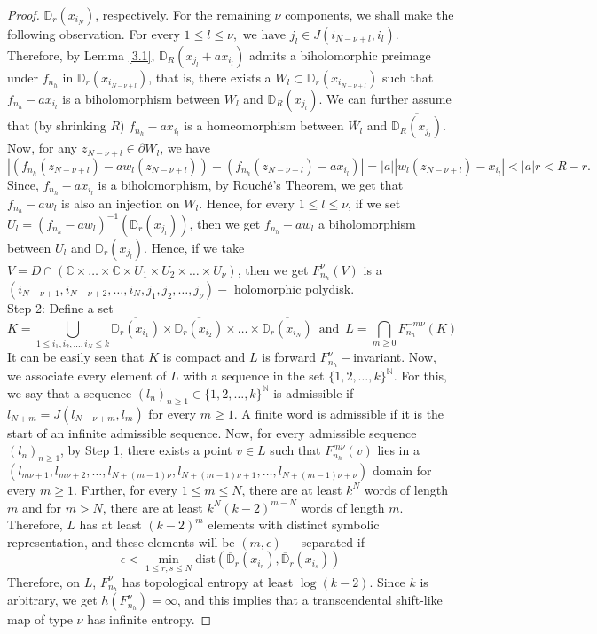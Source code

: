 \documentclass[12pt, reqno]{amsart}
\numberwithin{equation}{section}
\theoremstyle{definition}
\theoremstyle{remark}
\theoremstyle{plain}
\theoremstyle{definition}
\numberwithin{equation}{section}
\begin{document}
\begin{proof}
$\mathbb{D}_r(x_{i_{N}})$, respectively. For the remaining $\nu$ components, we shall make the following observation.
For every $1\leq l\leq \nu,$ we have $j_{l}\in J(i_{N-\nu+l}, i_l)$. Therefore, by Lemma \ref{3.1}, $\mathbb{D}_R(x_{j_{l}}+ax_{i_{l}})$ admits a biholomorphic preimage under $f_{n_h}$ in $\mathbb{D}_r(x_{i_{N-\nu+l}})$, that is, there exists a $W_l\subset \mathbb{D}_r(x_{i_{N-\nu+l}})$ such that $f_{n_h}-ax_{i_l}$ is a biholomorphism between $W_l$ and $\mathbb{D}_R(x_{j_l})$. We can further assume that (by shrinking $R$) $f_{n_h}-ax_{i_l}$ is a homeomorphism between $\overline{W_l}$ and  $\overline{\mathbb{D}_R(x_{j_l})}$. Now, for any $z_{N-\nu+l}\in\partial W_l$, we have 
\[|(f_{n_h}(z_{N-\nu+l})-aw_l(z_{N-\nu+l}))-(f_{n_h}(z_{N-\nu+l})-ax_{i_l})|=|a||w_l(z_{N-\nu+l})-x_{i_l}|<|a|r<R-r.\]
Since, $f_{n_h}-ax_{i_l}$ is a biholomorphism, by Rouch\'e's Theorem, we get that $f_{n_h}-aw_l$ is also an injection on $W_l$. Hence, for every $1\leq l\leq \nu$, if we set $U_l=(f_{n_h}-aw_l)^{-1}(\mathbb{D}_r(x_{j_l}))$, then we get $f_{n_h}-aw_l$ a biholomorphism between $U_l$ and $\mathbb{D}_r(x_{j_l})$. Hence, if we take $V=D\cap (\mathbb{C}\times\dots\times \mathbb{C}\times U_1\times U_2\times\dots\times U_{\nu})$, then we get $F^{\nu}_{n_h}(V)$ is a $(i_{N-\nu+1}, i_{N-\nu+2},\dots,i_N, j_1, j_2,\dots, j_{\nu})-$ holomorphic polydisk.\\
Step 2:  Define a set 
\[K=\bigcup_{1\leq i_1,i_2,\dots,i_N\leq k}\overline{\mathbb{D}_r(x_{i_1})}\times\overline{\mathbb{D}_r(x_{i_2})}\times\dots\times\overline{\mathbb{D}_r(x_{i_N})} \,\text{ and }\,L=\bigcap_{m\geq 0}F_{n_h}^{-m\nu}(K)\]
It can be easily seen that $K$ is compact and $L$ is forward $F_{n_h}^{\nu}-$invariant. Now, we associate every element of $L$ with a sequence in the set $\{1,2,\dots,k\}^{\mathbb{N}}$. For this, we say that a sequence $(l_n)_{n\geq 1}\in\{1,2,\dots,k\}^{\mathbb{N}}$ is admissible if $l_{N+m}=J(l_{N-\nu+m}, l_m)$ for every $m\geq 1$. A finite word is admissible if it is the start of an infinite admissible sequence. Now, for every admissible sequence $(l_n)_{n\geq 1}$, by Step 1, there exists a point $v\in L$ such that $F_{n_h}^{m\nu}(v)$ lies in a $(l_{m\nu+1}, l_{m\nu+2},\dots,l_{N+(m-1)\nu}, l_{N+{(m-1)\nu}+1},\dots, l_{N+{(m-1)\nu+\nu}})$ domain for every $m\geq 1$. Further, for every $ 1\leq m\leq N$, there are at least $k^N$ words of length $m$ and for $m>N$, there are at least $k^N(k-2)^{m-N}$ words of length $m$. Therefore, $L$ has at least $(k-2)^{m}$ elements with distinct symbolic representation, and these elements will be $(m,\epsilon)-$ separated if 
\[\epsilon<\min_{1\leq r,s\leq N}\text{dist}(\overline{\mathbb{D}}_r(x_{i_r}), \overline{\mathbb{D}}_r(x_{i_s}))\]
Therefore, on $L$, $F_{n_h}^{\nu}$ has topological entropy at least $\log (k-2)$. Since $k$ is arbitrary, we get $h(F_{n_h}^{\nu})=\infty$, and this implies that a transcendental shift-like map of type $\nu$ has infinite entropy.
\end{proof}
\end{document}
